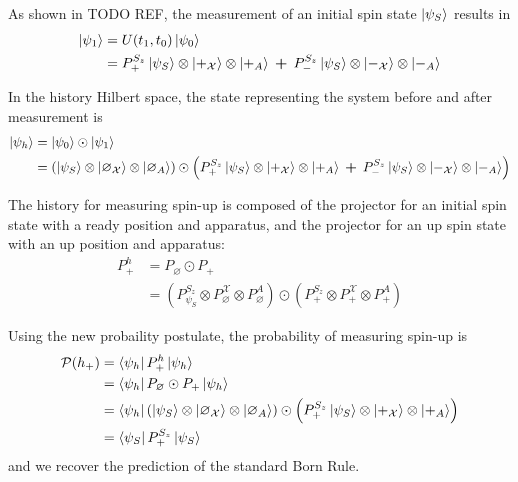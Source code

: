 As shown in TODO REF, the measurement of an initial spin state $\ket{\psi_S}$ results in
\begin{align}
  \ket{{\psi}_1} &= U(t_1, t_0)\ket{{\psi}_0} \\ \nonumber
  &= P^{S_z}_+ \ket{\psi_S} \otimes \ket{+_\mathcal{X}} \otimes \ket{+_A}\: \bm{+} \: P^{S_z}_- \ket{\psi_S} \otimes \ket{-_\mathcal{X}} \otimes \ket{-_A}
\end{align}

In the history Hilbert space, the state representing the system before and after measurement is
\begin{align}
  \ket{\psi_h} &= \ket{\psi_0} \odot \ket{\psi_1} \\ \nonumber
  &= \left(\ket{\psi_S} \otimes \ket{\varnothing_\mathcal{X}} \otimes \ket{\varnothing_A} \right) \odot \left(P^{S_z}_+ \ket{\psi_S} \otimes \ket{+_\mathcal{X}} \otimes \ket{+_A} \: \bm{+} \: P^{S_z}_- \ket{\psi_S} \otimes \ket{-_\mathcal{X}} \otimes \ket{-_A} \right)
\end{align}

The history for measuring spin-up is composed of the projector for an initial spin state with a ready position and apparatus, and the projector for an up spin state with an up position and apparatus:
\begin{align}
  P^h_+ &= P_\varnothing \odot P_+ \\ \nonumber
  &= \left(P^{S_z}_{\psi_S} \otimes P^\mathcal{X}_\varnothing \otimes P^A_\varnothing \right) \odot \left(P^{S_z}_+ \otimes P^\mathcal{X}_+ \otimes P^A_+ \right)
\end{align}

Using the new probaility postulate, the probability of measuring spin-up is
\begin{align}
    \mathcal{P}(h_+) &= \bra{\psi_h} P^h_+ \ket{\psi_h} \\ \nonumber
    &= \bra{\psi_h} P_\varnothing \odot P_+ \ket{\psi_h} \\ \nonumber
    &=  \bra{\psi_h}  \left(\ket{\psi_S} \otimes \ket{\varnothing_\mathcal{X}} \otimes \ket{\varnothing_A} \right)\odot \left(P^{S_z}_+\ket{\psi_S} \otimes \ket{+_\mathcal{X}} \otimes \ket{+_A} \right) \\ \nonumber
    &= \bra{\psi_S} P^{S_z}_+ \ket{\psi_S}
\end{align}
and we recover the prediction of the standard Born Rule.

